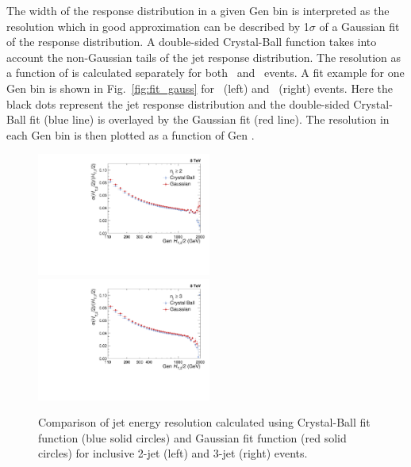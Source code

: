 The width of the response distribution in a given Gen \httwo bin is interpreted as the resolution which in good approximation can be described by 1$\sigma$ of a Gaussian fit of the response distribution. A double-sided Crystal-Ball function takes into account the non-Gaussian tails of the jet response distribution. The resolution as a function of \httwo is calculated separately for both \njt~and \njth~events. A fit example for one Gen \httwo bin is shown in Fig.~\ref{fig:fit_gauss} for \njt~(left) and \njth~(right) events. Here the black dots represent the jet response distribution and the double-sided Crystal-Ball fit (blue line) is overlayed by the Gaussian fit (red line). The resolution in each Gen \httwo bin is then plotted as a function of Gen \httwo. 

\begin{figure}[!h]
 \begin{center}
 \hspace*{-5mm}\includegraphics[width=0.51\textwidth]{Plots_HT_2_150/Comparison_Resolution_Crystal_Gauss_2.pdf}%
 ~~\includegraphics[width=0.51\textwidth]{Plots_HT_2_150/Comparison_Resolution_Crystal_Gauss_3.pdf}
 \caption[Comparison of jet energy resolution calculated using Crystal-Ball fit function and Gaussian fit function]{Comparison of jet energy resolution calculated using Crystal-Ball fit function (blue solid circles) and Gaussian fit function (red solid circles) for inclusive 2-jet (left) and 3-jet (right) events.}
 \label{fig:res_comp}
 \end{center}
\end{figure}

